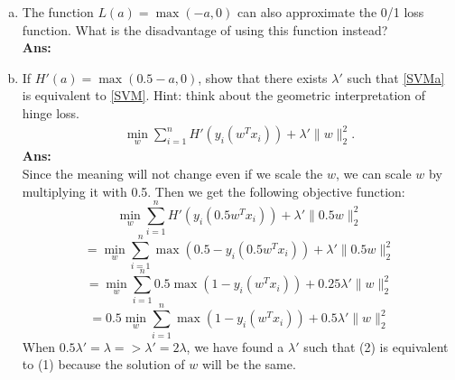 \documentclass[11pt]{article}
\begin{document}
\begin{enumerate}[(a)]
\item The function $L(a) = \max(-a,0)$ can also approximate the 0/1 loss function. What is the disadvantage of using this function instead?\\
\textbf{Ans:}\\



\item If $H'(a) = \max(0.5-a,0)$, show that there exists $\lambda'$ such that \eqref{SVMa} is equivalent to \eqref{SVM}.  Hint: think about the geometric interpretation of hinge loss.
\begin{align}\label{SVMa}
\min_{w}\sum_{i=1}^n H'(y_i(w^Tx_i)) + \lambda'\|w\|_2^2.
\end{align}
\textbf{Ans:}\\
Since the meaning will not change even if we scale the $w$, we can scale $w$ by multiplying it with 0.5. Then we get the following objective function:
$$\min_{w}\sum_{i=1}^n H'(y_i(0.5w^Tx_i)) + \lambda'\|0.5w\|_2^2$$
$$=\min_{w}\sum_{i=1}^n \max(0.5-y_i(0.5w^Tx_i)) + \lambda'\|0.5w\|_2^2$$
$$=\min_{w}\sum_{i=1}^n 0.5\max(1-y_i(w^Tx_i)) + 0.25\lambda'\|w\|_2^2$$
$$=0.5\min_{w}\sum_{i=1}^n \max(1-y_i(w^Tx_i)) + 0.5\lambda'\|w\|_2^2$$
When $0.5\lambda'=\lambda => \lambda' = 2\lambda$, we have found a $\lambda'$ such that (2) is equivalent to (1) because the solution of $w$ will be the same.

\end{enumerate}

\end{document}
